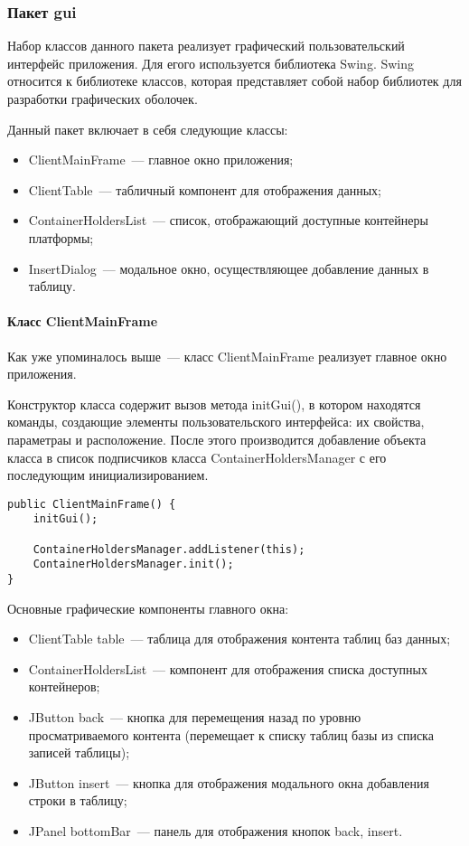 \subsubsection{Пакет gui}
Набор классов данного пакета реализует графический пользовательский интерфейс приложения. Для егого используется библиотека Swing. Swing относится к библиотеке классов, которая представляет собой набор библиотек для разработки графических оболочек.

Данный пакет включает в себя следующие классы:
\begin{itemize}
\item ClientMainFrame~--- главное окно приложения;
\item ClientTable~--- табличный компонент для отображения данных;
\item ContainerHoldersList~--- список, отображающий доступные контейнеры платформы;
\item InsertDialog~--- модальное окно, осуществляющее добавление данных в таблицу.
\end{itemize}

\paragraph{Класс ClientMainFrame}
Как уже упоминалось выше~--- класс ClientMainFrame реализует главное окно приложения.

Конструктор класса содержит вызов метода initGui(), в котором находятся команды, создающие элементы пользовательского интерфейса: их свойства, параметраы и расположение. После этого производится добавление объекта класса в список подписчиков класса ContainerHoldersManager с его последующим инициализированием.
\begin{lstlisting}
public ClientMainFrame() {
    initGui();

    ContainerHoldersManager.addListener(this);
    ContainerHoldersManager.init();
}
\end{lstlisting}

Основные графические компоненты главного окна:
\begin{itemize}
\item ClientTable table~--- таблица для отображения контента таблиц баз данных;
\item ContainerHoldersList~--- компонент для отображения списка доступных контейнеров;
\item JButton back~--- кнопка для перемещения назад по уровню просматриваемого контента (перемещает к списку таблиц базы из списка записей таблицы);
\item JButton insert~--- кнопка для отображения модального окна добавления строки в таблицу;
\item JPanel bottomBar~--- панель для отображения кнопок back, insert.
\end{itemize}

